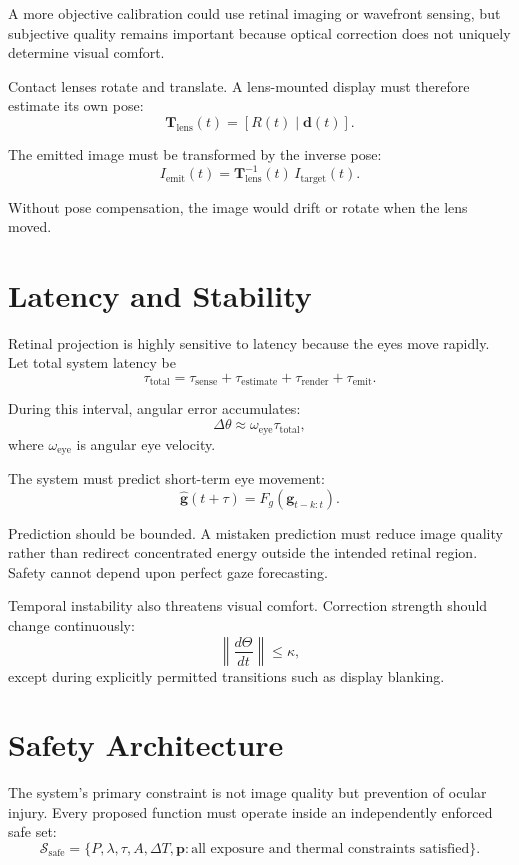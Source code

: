\documentclass[11pt]{article}
\begin{document}
A more objective calibration could use retinal imaging or wavefront sensing, but subjective quality remains important because optical correction does not uniquely determine visual comfort.

Contact lenses rotate and translate. A lens-mounted display must therefore estimate its own pose:
\[
\mathbf{T}_{\mathrm{lens}}(t)=[R(t)\mid\mathbf{d}(t)].
\]

The emitted image must be transformed by the inverse pose:
\[
I_{\mathrm{emit}}(t)=\mathbf{T}_{\mathrm{lens}}^{-1}(t)\,I_{\mathrm{target}}(t).
\]

Without pose compensation, the image would drift or rotate when the lens moved.

\section{Latency and Stability}

Retinal projection is highly sensitive to latency because the eyes move rapidly. Let total system latency be
\[
\tau_{\mathrm{total}}=\tau_{\mathrm{sense}}+\tau_{\mathrm{estimate}}+\tau_{\mathrm{render}}+\tau_{\mathrm{emit}}.
\]

During this interval, angular error accumulates:
\[
\Delta\theta\approx\omega_{\mathrm{eye}}\tau_{\mathrm{total}},
\]
where $\omega_{\mathrm{eye}}$ is angular eye velocity.

The system must predict short-term eye movement:
\[
\widehat{\mathbf{g}}(t+\tau)=F_g\left(\mathbf{g}_{t-k:t}\right).
\]

Prediction should be bounded. A mistaken prediction must reduce image quality rather than redirect concentrated energy outside the intended retinal region. Safety cannot depend upon perfect gaze forecasting.

Temporal instability also threatens visual comfort. Correction strength should change continuously:
\[
\left\|\frac{d\Theta}{dt}\right\|\leq\kappa,
\]
except during explicitly permitted transitions such as display blanking.

\section{Safety Architecture}

The system's primary constraint is not image quality but prevention of ocular injury. Every proposed function must operate inside an independently enforced safe set:
\[
\mathcal{S}_{\mathrm{safe}}=\{P,\lambda,\tau,A,\Delta T,\mathbf{p} : \text{all exposure and thermal constraints satisfied}\}.
\]
\end{document}
